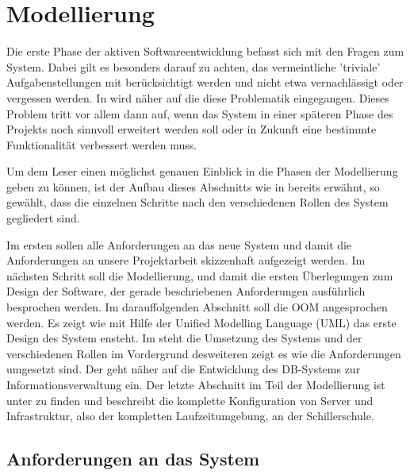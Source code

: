 \documentclass[12pt, twoside, a4paper, ngerman]{article}
\begin{document}
\newpage

\section{Modellierung}\label{sec:Modellierung}

Die erste Phase der aktiven Softwareentwicklung befasst sich mit den Fragen zum System. Dabei gilt es besonders darauf zu achten, das vermeintliche 'triviale' Aufgabenstellungen mit berücksichtigt werden und nicht etwa vernachlässigt oder vergessen werden.  In  wird näher auf die diese Problematik eingegangen. Dieses Problem tritt vor allem dann auf, wenn das System in einer späteren Phase des Projekts noch sinnvoll erweitert werden soll oder in Zukunft eine bestimmte Funktionalität verbessert werden muss.

Um dem Leser einen möglichst genauen Einblick in die Phasen der Modellierung geben zu können, ist der Aufbau dieses Abschnitts wie in  bereits erwähnt, so gewählt, dass die einzelnen Schritte nach den verschiedenen Rollen des System gegliedert sind.

Im ersten  sollen alle Anforderungen an das neue System und damit die Anforderungen an unsere Projektarbeit skizzenhaft aufgezeigt werden.
Im nächsten Schritt soll die Modellierung, und damit die ersten Überlegungen zum Design der Software, der gerade beschriebenen Anforderungen ausführlich besprochen werden.
Im darauffolgenden Abschnitt soll die \ac{OOM} angesprochen werden. Es zeigt wie mit Hilfe der \gls{Unified Modelling Language} (UML) das erste Design des System ensteht.  
Im  steht die Umsetzung des Systems und der verschiedenen Rollen im Vordergrund desweiteren zeigt es wie die Anforderungen umgesetzt sind.
Der  geht näher auf die Entwicklung des \ac{DB}-Systems zur Informationsverwaltung ein.
Der letzte Abschnitt im Teil der Modellierung ist unter  zu finden und beschreibt die komplette Konfiguration von Server und Infrastruktur, also der kompletten Laufzeitumgebung, an der Schillerschule. 

\subsection{Anforderungen an das System}\label{subsec:Anforderungen an das System}
\end{document}

